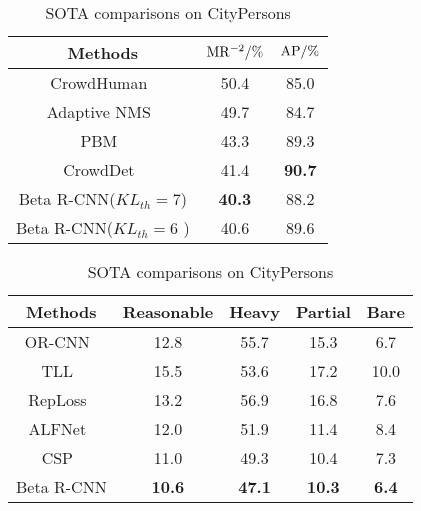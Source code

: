 \documentclass{article}
\begin{document}
\begin{table}[htbp]
    \begin{minipage}[t]{0.5\textwidth}
\centering
        \caption{SOTA comparisons on CrowdHuman}
        \scriptsize
\begin{tabular}{ccc}
            \toprule
            Methods & $\rm MR^{-2}/\%$ & $\rm AP/\%$ \\
            \midrule
            CrowdHuman~\cite{crowdhuman} & 50.4 & 85.0 \\
            Adaptive NMS~\cite{AdaptiveNMS} & 49.7 & 84.7 \\
            PBM~\cite{PBM} & 43.3 & 89.3 \\
            CrowdDet~\cite{EMD} & 41.4 & \textbf{90.7} \\
            \midrule
            Beta R-CNN($KL_{th}=7$) & \textbf{40.3} & 88.2 \\
            Beta R-CNN($KL_{th}=6$ )& 40.6 & 89.6 \\
            \bottomrule
        \end{tabular}
    \label{crowdhuman}
    \end{minipage}
    \begin{minipage}[t]{0.5\textwidth}
        \centering
        \caption{SOTA comparisons on CityPersons}
        \label{citypersons}
        \scriptsize
        \begin{tabular}{ccccc}
            \toprule
            Methods &  Reasonable & Heavy & Partial & Bare \\
            \midrule
            OR-CNN~\cite{OR-CNN} & 12.8 & 55.7 & 15.3 & 6.7 \\
            TLL~\cite{TLL} & 15.5 & 53.6 & 17.2 & 10.0 \\
            RepLoss~\cite{RepLoss} & 13.2 & 56.9 & 16.8 & 7.6 \\
            ALFNet~\cite{ALFNet} & 12.0 & 51.9 & 11.4 & 8.4 \\
            CSP~\cite{csp} & 11.0 & 49.3 & 10.4 & 7.3 \\
            \midrule
            Beta R-CNN & \textbf{10.6} & \textbf{47.1} & \textbf{10.3} & \textbf{6.4} \\
\bottomrule
        \end{tabular}
    \end{minipage}
\end{table}
\end{document}
